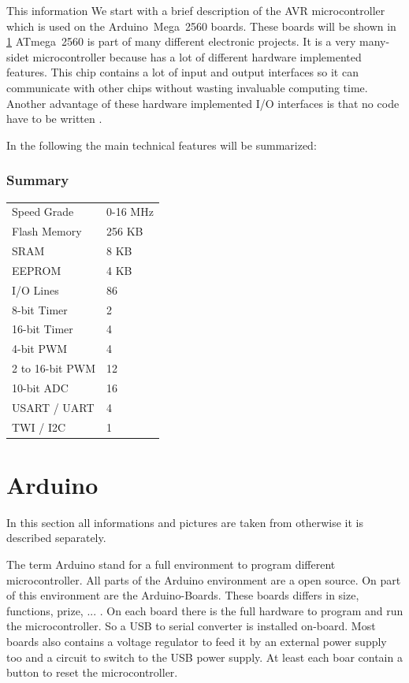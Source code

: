 This information 
We start with a brief description of the AVR microcontroller which is used on the Arduino~Mega~2560 boards.
These boards will be shown in \ref{sec:arduino}
ATmega~2560 is part of many different electronic projects.
It is a very many-sidet microcontroller because has a lot of different hardware implemented features.
This chip contains a lot of input and output interfaces so it can communicate with other chips without wasting invaluable computing time.
Another advantage of these hardware implemented I/O interfaces is that no code have to be written .

In the following the main technical features will be summarized:
\subsubsection{Summary} \label{sec:atmega2560Summary}
\begin{tabular}{ll}
Speed Grade	& 0-16 MHz	\\
Flash Memory	& 256 KB	\\
SRAM			& 8 KB	\\
EEPROM		& 4 KB	\\
I/O Lines		& 86		\\
8-bit Timer		& 2		\\
16-bit Timer	& 4		\\
4-bit PWM		& 4		\\
2 to 16-bit PWM	& 12		\\
10-bit ADC		& 16		\\
USART / UART	& 4		\\
TWI / I2C		& 1		\\
\end{tabular}


\section{Arduino} \label {sec:arduino}
In this section all informations and pictures are taken from \cite{web:arduino} otherwise it is described separately.

The term Arduino stand for a full environment to program different microcontroller.
All parts of the Arduino environment are a open source. 
On part of this environment are the Arduino-Boards.
These boards differs in size, functions, prize, ... .
On each board there is the full hardware to program and run the microcontroller.
So a USB to serial converter is installed on-board.
Most boards also contains a voltage regulator to feed it by an external power supply too and a circuit to switch to the USB power supply.
At least each boar contain a button to reset the microcontroller.

